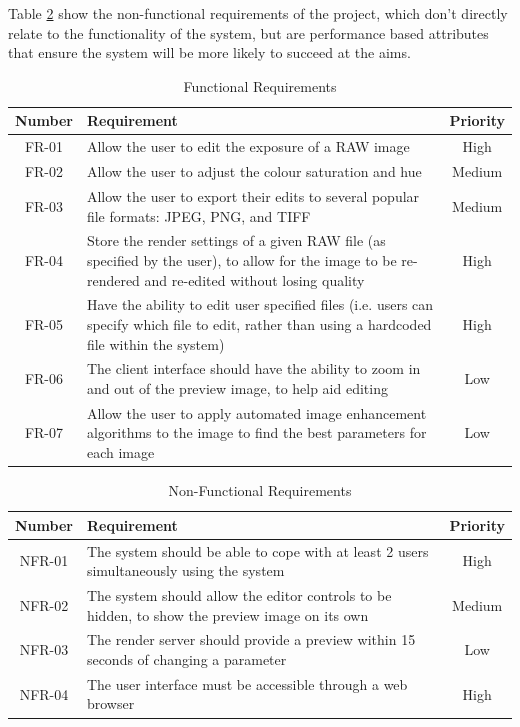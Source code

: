 \documentclass[12pt,a4paper]{article}
\begin{document}
Table \ref{NFRTable} show the non-functional requirements of the project, which don't directly relate
to the functionality of the system, but are performance based attributes that ensure the system
will be more likely to succeed at the aims.

\begin{table}
  \centering
  \begin{tabular}{| c | p{12cm} | c |}
    \hline
    \textbf{Number} & \textbf{Requirement} & \textbf{Priority} \\
    \hline
    FR-01 & Allow the user to edit the exposure of a RAW image & High \\
    \hline
    FR-02 & Allow the user to adjust the colour saturation and hue & Medium \\
    \hline
    FR-03 & Allow the user to export their edits to several popular file formats: JPEG, PNG, and TIFF & Medium \\
    \hline
    FR-04 & Store the render settings of a given RAW file (as specified by the user), to allow for the image to be re-rendered and re-edited without losing quality & High \\
    \hline
    FR-05 & Have the ability to edit user specified files (i.e. users can specify which file to edit, rather than using a hardcoded file within the system) & High \\
    \hline
    FR-06 & The client interface should have the ability to zoom in and out of the preview image, to help aid editing & Low \\
    \hline
    FR-07 & Allow the user to apply automated image enhancement algorithms to the image to find the best parameters for each image & Low \\
    \hline
  \end{tabular}
  \caption{Functional Requirements}
  \label{FunctionalRequirementsTable}
\end{table}

\begin{table}
  \centering
  \begin{tabular}{| c | p{12cm} | c |}
    \hline
    \textbf{Number} & \textbf{Requirement} & \textbf{Priority} \\
    \hline
    NFR-01 & The system should be able to cope with at least 2 users simultaneously using the system & High \\
    \hline
    NFR-02 & The system should allow the editor controls to be hidden, to show the preview image on its own & Medium \\
    \hline
    NFR-03 & The render server should provide a preview within 15 seconds of changing a parameter & Low \\
    \hline
    NFR-04 & The user interface must be accessible through a web browser & High \\
    \hline
  \end{tabular}
  \caption{Non-Functional Requirements}
  \label{NFRTable}
\end{table}
\end{document}
